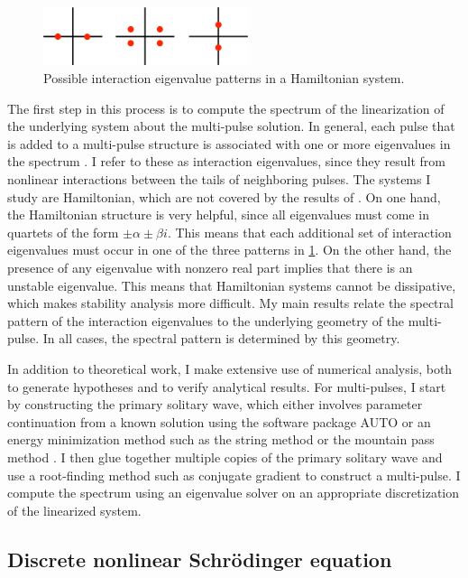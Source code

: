 \documentclass[12pt,reqno,oneside,hidelinks]{article}
\begin{document}
\begin{figure}
    \includegraphics[width=6cm]{images/inteigpattern.eps}
    \caption{Possible interaction eigenvalue patterns in a Hamiltonian system.} 
    \label{fig:inteigpattern}
\end{figure}
The first step in this process is to compute the spectrum of the linearization of the underlying system about the multi-pulse solution. In general, each pulse that is added to a multi-pulse structure is associated with one or more eigenvalues in the spectrum \cite{Sandstede1998}. I refer to these as interaction eigenvalues, since they result from nonlinear interactions between the tails of neighboring pulses. The systems I study are Hamiltonian, which are not covered by the results of \cite{Sandstede1998}. On one hand, the Hamiltonian structure is very helpful, since all eigenvalues must come in quartets of the form $\pm \alpha \pm \beta i$. This means that each additional set of interaction eigenvalues must occur in one of the three patterns in \cref{fig:inteigpattern}. On the other hand, the presence of any eigenvalue with nonzero real part implies that there is an unstable eigenvalue. This means that Hamiltonian systems cannot be dissipative, which makes stability analysis more difficult. My main results relate the spectral pattern of the interaction eigenvalues to the underlying geometry of the multi-pulse. In all cases, the spectral pattern is determined by this geometry. 

In addition to theoretical work, I make extensive use of numerical analysis, both to generate hypotheses and to verify analytical results. For multi-pulses, I start by constructing the primary solitary wave, which either involves parameter continuation from a known solution using the software package AUTO or an energy minimization method such as the string method \cite{Chamard2011} or the mountain pass method \cite{Chen1997}. I then glue together multiple copies of the primary solitary wave and use a root-finding method such as conjugate gradient to construct a multi-pulse. I compute the spectrum using an eigenvalue solver on an appropriate discretization of the linearized system.

\subsection*{Discrete nonlinear Schr\"odinger equation}
\end{document}
